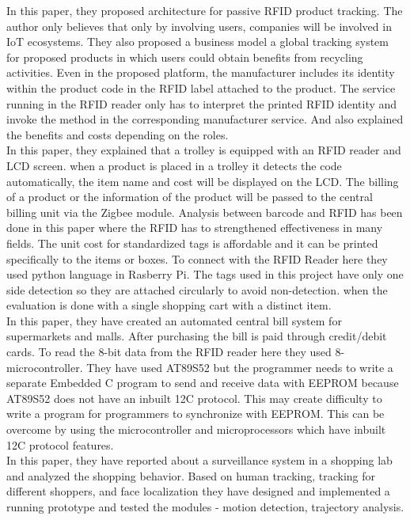 \documentclass[conference]{IEEEtran}
\begin{document}
In this paper\cite{b21}, they proposed architecture for passive RFID product tracking. The author only believes that only by involving users, companies will be involved in IoT ecosystems. They also proposed a business model a global tracking system for proposed products in which users could obtain benefits from recycling activities. Even in the proposed platform, the manufacturer includes its identity within the product code in the RFID label attached to the product. The service running in the RFID reader only has to interpret the printed RFID identity and invoke the method in the corresponding manufacturer service. And also explained the benefits and costs depending on the roles.\\

In this paper\cite{b22}, they explained that a trolley is equipped with an RFID reader and LCD screen. when a product is placed in a trolley it detects the code automatically, the item name and cost will be displayed on the LCD. The billing of a product or the information of the product will be passed to the central billing unit via the Zigbee module. Analysis between barcode and RFID has been done in this paper where the RFID has to strengthened effectiveness in many fields. The unit cost for standardized tags is affordable and it can be printed specifically to the items or boxes. To connect with the RFID Reader here they used python language in Rasberry Pi. The tags used in this project have only one side detection so they are attached circularly to avoid non-detection. when the evaluation is done with a single shopping cart with a distinct item.\\

In this paper\cite{b23}, they have created an automated central bill system for supermarkets and malls. After purchasing the bill is paid through credit/debit cards. To read the 8-bit data from the RFID reader here they used 8-microcontroller. They have used AT89S52 but the programmer needs to write a separate Embedded C program to send and receive data with EEPROM because AT89S52 does not have an inbuilt 12C protocol. This may create difficulty to write a program for programmers to synchronize with EEPROM. This can be overcome by using the microcontroller and microprocessors which have inbuilt 12C protocol features.\\

In this paper\cite{b24}, they have reported about a surveillance system in a shopping lab and analyzed the shopping behavior. Based on human tracking, tracking for different shoppers, and face localization they have designed and implemented a running prototype and tested the modules - motion detection, trajectory analysis. \\
\end{document}
